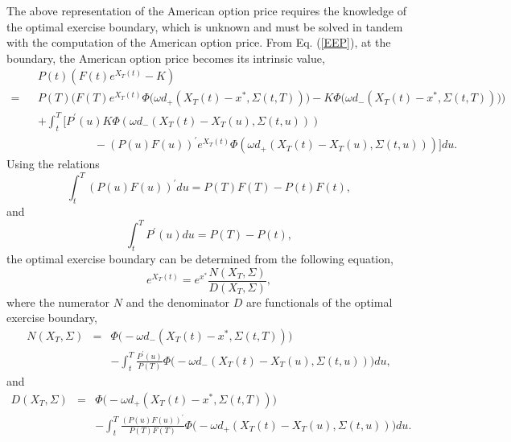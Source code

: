 \documentclass[12pt]{article}
\begin{document}
    The above representation of the American option price requires the knowledge of the optimal
    exercise boundary, which is unknown and must be solved in tandem with the computation of the American
    option price. From Eq. (\ref{EEP}), at the boundary, the American option price becomes its intrinsic
    value,
    \begin{eqnarray}
       \label{Boundary}
       && P(t)\left(F(t)e^{X_T(t)}-K\right)\nonumber\\
      =&& P(T)\bigg(F(T)e^{X_T(t)}\Phi\big(\omega d_+\left(X_T(t)-x^*,\Sigma(t,T)\right)\big)
                                                      -K\Phi\big(\omega d_-\left(X_T(t)-x^*,\Sigma(t,T)\right)\big)\bigg)\nonumber\\
       &&+\int_t^T\bigg[P^{\prime}(u)K\Phi\left(\omega d_-\left(X_T(t)-X_T(u), \Sigma(t,u)\right)\right)\nonumber\\
                 &&\quad\quad\quad\quad\quad
                  -\left(P(u)F(u)\right)^{\prime}e^{X_T(t)}\Phi\left(\omega d_+\left(X_T(t)-X_T(u), \Sigma(t,u)\right)\right)\bigg]du.
    \end{eqnarray}
    Using the relations
    \begin{equation}
      \int_t^T\left(P(u)F(u)\right)^{\prime}du=P(T)F(T)-P(t)F(t),
    \end{equation}
    and
    \begin{equation}
      \int_t^TP^{\prime}(u)du=P(T)-P(t),
    \end{equation}
    the optimal exercise boundary can be determined from the following equation,
    \begin{equation}
      e^{X_T(t)}=e^{x^*}\frac{N(X_T, \Sigma)}{D(X_T, \Sigma)},
    \end{equation}
    where the numerator $N$ and the denominator $D$ are functionals of the optimal exercise boundary,
    \begin{eqnarray}
      N(X_T, \Sigma)&=&\Phi\big(-\omega d_-\left(X_T(t)-x^*,\Sigma(t,T)\right)\big)\nonumber\\
      &&-\int_t^T\frac{P^{\prime}(u)}{P(T)}\Phi\big(-\omega d_-\left(X_T(t)-X_T(u),\Sigma(t,u)\right)\big)du,
    \end{eqnarray}
    and
    \begin{eqnarray}
      D(X_T, \Sigma)&=&\Phi\big(-\omega d_+\left(X_T(t)-x^*,\Sigma(t,T)\right)\big)\nonumber\\
      &&-\int_t^T\frac{\left(P(u)F(u)\right)^{\prime}}{P(T)F(T)}\Phi\big(-\omega d_+\left(X_T(t)-X_T(u),\Sigma(t,u)\right)\big)du.
    \end{eqnarray}
\end{document}
